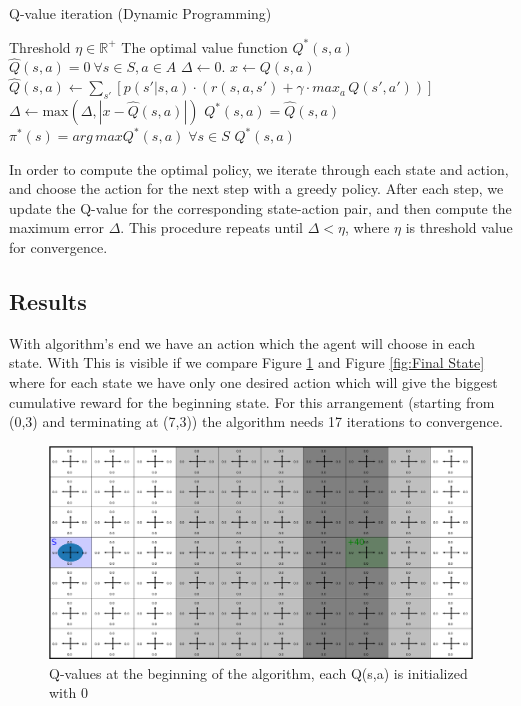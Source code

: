 \documentclass{article}
\begin{document}
\begin{algorithm}[h]
    \caption{Q-value iteration (Dynamic Programming)}
    \label{Dynamic Programming}
 \begin{algorithmic}
     Threshold  $\eta \in \mathbb{R}^+$
     The optimal value function $Q^*(s,a)$
     $\hat{Q}(s,a) = 0\  \forall s \in S, a\in A$
    \REPEAT
        \STATE  $\Delta \leftarrow 0$.
                \STATE $x \leftarrow Q(s,a)$
                \STATE $\hat{Q}(s,a) \leftarrow \sum_{s'}[p(s'|s,a) \cdot (r(s,a,s') + \gamma \cdot max_a\,Q(s',a') )]$
                \STATE $\Delta \leftarrow \text{max}(\Delta,|x - \hat{Q}(s,a)|)$
            \ENDFOR
        \ENDFOR
    \UNTIL{$\Delta < \eta$ }
    \STATE $Q^*(s,a) = \hat{Q}(s,a)$
    \STATE $\pi^*(s) = arg\,maxQ^*(s,a) \; \forall s \in S$
     $Q^*(s,a)$
 \end{algorithmic}
\end{algorithm}
 
In order to compute the optimal policy, we iterate through each state and action, and choose the action for the next step with a greedy policy.
After each step, we update the Q-value for the corresponding state-action pair, and then compute the maximum error \(\Delta\).
This procedure repeats until \(\Delta < \eta\), where \(\eta\)  is threshold value for convergence.
\subsection{Results}

With algorithm's end we have an action which the agent will choose in each state. With 
This is visible if we compare Figure \ref{fig:Initial State} and Figure \ref{fig:Final State} where for 
each state we have only one desired action which will give the biggest cumulative reward for the beginning state. For this arrangement 
(starting from (0,3) and terminating at (7,3)) the algorithm needs 17 iterations to convergence.
    
\begin{figure}[H]
    \centering
    \includegraphics[scale=0.17]{images/Qvalue-initial.png}
    \caption{Q-values at the beginning of the algorithm, each Q(s,a) is initialized with 0 }
    \label{fig:Initial State}
\end{figure}
\end{document}
